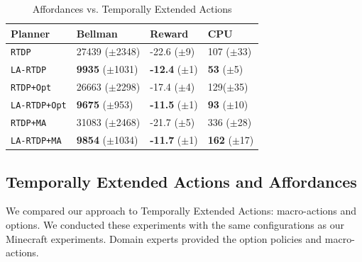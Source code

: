 \documentclass[letterpaper]{article}
\newcommand{\ra}[1]{\renewcommand{\arraystretch}{#1}} %
\begin{document}
\begin{table}[b]
\ra{1.1}
\small
\begin{tabular}{@{}llll@{}}\toprule
Planner & Bellman & Reward & CPU \\ \midrule
\texttt{RTDP}   			&	27439 ($\pm$2348)		&	-22.6 ($\pm$9)		& 107 ($\pm$33) \\
\texttt{LA-RTDP} 			& 	{\bf 9935} ($\pm$1031)	&	{\bf -12.4} ($\pm$1)& {\bf 53} ($\pm$5) \\ \hline
\texttt{RTDP+Opt}  		&	26663 ($\pm$2298)		&	-17.4 ($\pm$4) 		& 129($\pm$35) \\
\texttt{LA-RTDP+Opt} 		& 	{\bf 9675} ($\pm$953)	&	{\bf -11.5} ($\pm$1)	&{\bf 93} ($\pm$10) \\ \hline
\texttt{RTDP+MA}  		&	31083 ($\pm$2468)		&	-21.7	 ($\pm$5)		&336 ($\pm$28) \\
\texttt{LA-RTDP+MA}  		& 	{\bf 9854} ($\pm$1034)	&	{\bf -11.7} ($\pm$1)	&{\bf 162} ($\pm$17) \\ %
\bottomrule
\end{tabular}
\caption{Affordances vs. Temporally Extended Actions}
\label{table:temp_ext_act_results}
\end{table}


\subsection{Temporally Extended Actions and Affordances}

We compared our approach to Temporally Extended Actions: macro-actions
and options. We conducted these experiments with the same
configurations as our Minecraft experiments. Domain experts provided
the option policies and macro-actions.
\end{document}
